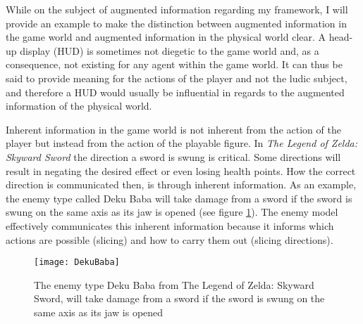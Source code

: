While on the subject of augmented information regarding my framework, I will provide an example to make the distinction between augmented information in the game world and augmented information in the physical world clear. A head-up display (HUD) is sometimes not diegetic to the game world and, as a consequence, not existing for any agent within the game world. It can thus be said to provide meaning for the actions of the player and not the ludic subject, and therefore a HUD would usually be influential in regards to the augmented information of the physical world.

Inherent information in the game world is not inherent from the action of the player but instead from the action of the playable figure. In \textit{The Legend of Zelda: Skyward Sword} \cite{skyward} the direction a sword is swung is critical. Some directions will result in negating the desired effect or even losing health points. How the correct direction is communicated then, is through inherent information. As an example, the enemy type called Deku Baba will take damage from a sword if the sword is swung on the same axis as its jaw is opened (see figure \ref{dekubaba}). The enemy model effectively communicates this inherent information because it informs which actions are possible (slicing) and how to carry them out (slicing directions).

\begin{figure}[h]
  \texttt{[image: DekuBaba]}
  \caption{The enemy type Deku Baba from The Legend of Zelda: Skyward Sword, will take damage from a sword if the sword is swung on the same axis as its jaw is opened}
  \label{dekubaba}
\end{figure}


